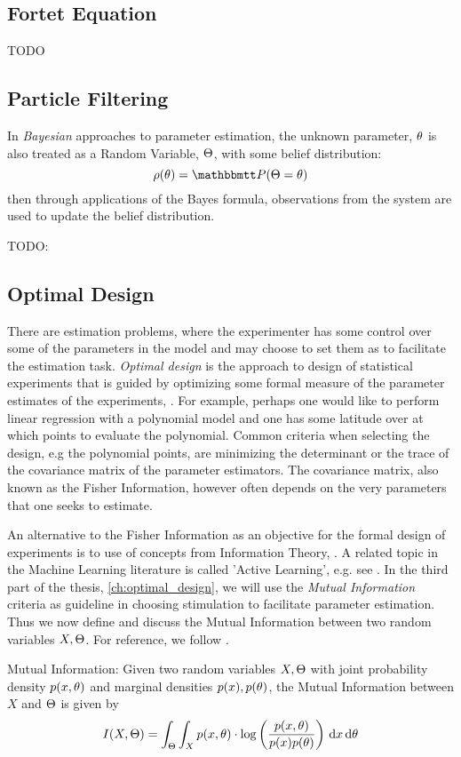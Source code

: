 \subsection{Fortet Equation}
TODO

\subsection{Particle Filtering}
In {\sl Bayesian} approaches to parameter estimation, the unknown parameter,
${ \theta}$ is also treated as a Random Variable, ${\Theta}$, with some belief
distribution: $$
\rho(\th) = \Prob(\Theta = \th)
$$
then through applications of the Bayes formula, observations from the system are
used to update the belief distribution.


TODO: 

\subsection{Optimal Design}
\label{sec:optimal_design}
There are estimation problems, where the experimenter has some control over some
of the parameters in the model and may choose to set them as to facilitate the
estimation task. {\sl Optimal design} is the approach to design of statistical
experiments that is guided by optimizing some formal measure of the parameter estimates of the experiments, \cite{Pukelsheim2006}. For example, perhaps one would like to
perform linear regression with a polynomial model and one has some latitude over
at which points to evaluate the polynomial. Common criteria when selecting the
design, e.g the polynomial points, are minimizing the determinant or the trace
of the covariance matrix of the parameter estimators. The covariance matrix,
also known as the Fisher Information, however often depends on the very
parameters that one seeks to estimate.

An alternative to the Fisher Information as an objective for the formal design
of experiments is to use of concepts from Information Theory, \cite{MacKay2003}.
A related topic in the Machine Learning literature is called 'Active Learning',
e.g. see \cite{Cohn1996,Settles2010,Seeger2008}. In the third part of the
thesis, \cref{ch:optimal_design}, we will use the {\sl Mutual Information}
criteria as guideline in choosing stimulation to facilitate parameter
estimation. Thus we now define and discuss the Mutual Information between two
random variables $X, {\Theta}$. For reference, we follow \cite{MacKay2003}.

\begin{defn}Mutual Information:
Given two random variables $X,{\Theta}$ with joint probability density
$p(x,{ \theta})$ and marginal densities $p(x), p({ \theta})$, the Mutual Information between
$X$ and ${\Theta}$ is given by
\begin{equation}
I(X,\Theta) = \int_\Theta \int_X p(x,{ \theta}) \cdot \log \left(
\frac{p(x,{ \theta})}{p(x)p({ \theta})}\right) \, \mathrm{d} x \, \mathrm{d} { \theta}
\label{eq:mutual_info_defn}
\end{equation}
\end{defn}

